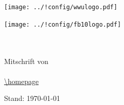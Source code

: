 \begin{titlepage}
\pagestyle{empty}
\begin{center}
\begin{minipage}{0.4\textwidth}
\begin{flushleft}
\texttt{[image: ../!config/wwulogo.pdf]}
\end{flushleft}
\end{minipage}
\hfill
\begin{minipage}{0.4\textwidth}
\begin{flushright}
\vspace*{0.3cm}
\texttt{[image: ../!config/fb10logo.pdf]} \
\end{flushright}
\end{minipage}

\vspace*{6cm}
\textbf{{\fontsize{40}{48} \selectfont \fach}} \\
\vspace{0.2cm} 
\textbf{{\Huge \untertitel}} \\
\vspace{0.6cm}
\LARGE{Mitschrift von \verfasser} \\
\vspace{0.6cm}
\LARGE{\semester} \\
\vspace*{2cm}
\footnotesize{\url{\homepage}}
\vfill

\vspace*{2cm}
\begin{flushright}
{\footnotesize Stand: \today}
\end{flushright}
\end{center}
\end{titlepage}
